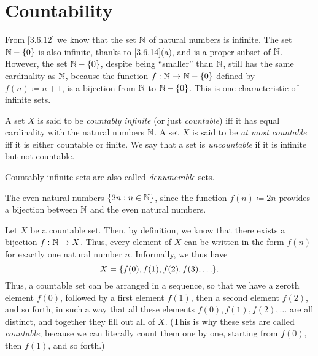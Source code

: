 \section{Countability}\label{sec:8.1}

\begin{note}
  From \cref{3.6.12} we know that the set \(\mathbb{N}\) of natural numbers is infinite.
  The set \(\mathbb{N} - \left\lbrace0\right\rbrace\) is also infinite, thanks to \cref{3.6.14}(a), and is a proper subset of \(\mathbb{N}\).
  However, the set \(\mathbb{N} - \left\lbrace0\right\rbrace\), despite being ``smaller'' than \(\mathbb{N}\), still has the same cardinality as \(\mathbb{N}\), because the function \(f : \mathbb{N} \to \mathbb{N} - \left\lbrace0\right\rbrace\) defined by \(f(n) \coloneqq n + 1\), is a bijection from \(\mathbb{N}\) to \(\mathbb{N} - \left\lbrace0\right\rbrace\).
  This is one characteristic of infinite sets.
\end{note}

\begin{defn}\label{8.1.1}
  A set \(X\) is said to be \emph{countably infinite} (or just \emph{countable}) iff it has equal cardinality with the natural numbers \(\mathbb{N}\).
  A set \(X\) is said to be \emph{at most countable} iff it is either countable or finite.
  We say that a set is \emph{uncountable} if it is infinite but not countable.
\end{defn}

\begin{rmk}\label{8.1.2}
  Countably infinite sets are also called \emph{denumerable} sets.
\end{rmk}

\begin{eg}\label{8.1.3}
  The even natural numbers \(\left\lbrace2n : n \in \mathbb{N}\right\rbrace\), since the function \(f(n) \coloneqq 2n\) provides a bijection between \(\mathbb{N}\) and the even natural numbers.
\end{eg}

\begin{note}
  Let \(X\) be a countable set.
  Then, by definition, we know that there exists a bijection \(f : \mathbb{N} \to X\).
  Thus, every element of \(X\) can be written in the form \(f(n)\) for exactly one natural number \(n\).
  Informally, we thus have
  \[
    X = \set{f(0), f(1), f(2), f(3), \dots}.
  \]
  Thus, a countable set can be arranged in a sequence, so that we have a zeroth element \(f(0)\), followed by a first element \(f(1)\), then a second element \(f(2)\), and so forth, in such a way that all these elements \(f(0), f(1), f(2), \dots\) are all distinct, and together they fill out all of \(X\).
  (This is why these sets are called \emph{countable};
  because we can literally count them one by one, starting from \(f(0)\), then \(f(1)\), and so forth.)
\end{note}


